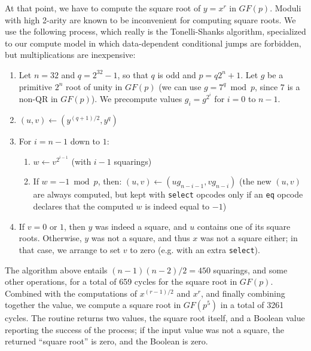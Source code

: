 \documentclass{llncs}
\newcommand{\GF}{GF}
\begin{document}
At that point, we have to compute the square root of $y = x^r$ in
$\GF(p)$. Moduli with high 2-arity are known to be inconvenient for
computing square roots. We use the following process, which really is
the Tonelli-Shanks algorithm, specialized to our compute model in which
data-dependent conditional jumps are forbidden, but multiplications are
inexpensive:
\begin{enumerate}

    \item Let $n = 32$ and $q = 2^{32} - 1$, so that $q$ is odd and
    $p = q 2^n + 1$. Let $g$ be a primitive $2^n$ root of unity in
    $\GF(p)$ (we can use $g = 7^q \bmod p$, since $7$ is a non-QR in
    $\GF(p)$). We precompute values $g_i = g^{2^i}$ for $i = 0$ to
    $n-1$.

    \item $(u, v) \leftarrow (y^{(q+1)/2}, y^q)$

    \item For $i = n-1$ down to $1$:
        \begin{enumerate}
            \item $w \leftarrow v^{2^{i-1}}$ (with $i-1$ squarings)
            \item If $w = -1 \bmod p$, then:
            $(u, v) \leftarrow (u g_{n-i-1}, v g_{n-i})$ (the new
            $(u, v)$ are always computed, but kept with \verb+select+
            opcodes only if an \verb+eq+ opcode declares that the computed
            $w$ is indeed equal to $-1$)
        \end{enumerate}

    \item If $v = 0$ or $1$, then $y$ was indeed a square, and $u$ contains
    one of its square roots. Otherwise, $y$ was not a square, and thus
    $x$ was not a square either; in that case, we arrange to set $v$ to
    zero (e.g. with an extra \verb+select+).

\end{enumerate}
The algorithm above entails $(n-1)(n-2)/2 = 450$ squarings, and some other
operations, for a total of 659 cycles for the square root in $\GF(p)$.
Combined with the computations of $x^{(r-1)/2}$ and $x^r$, and finally
combining together the value, we compute a square root in $\GF(p^5)$
in a total of 3261 cycles. The routine returns two values, the square
root itself, and a Boolean value reporting the success of the process;
if the input value was not a square, the returned ``square root'' is zero,
and the Boolean is zero.
\end{document}
